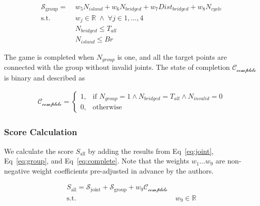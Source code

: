 \begin{equation}
 \begin{aligned}
 \mathcal{S}_{\text{group}} =  &\; w_5 N_{island} + w_6 N_{bridged} + w_7 Dist_{bridged} + w_8 N_{cycle}\\
   \textrm{s.t.} & \; w_j  \in \mathbb{R} \; \wedge \;   \forall j \in 1, \dotsc , 4 \\
   & \; N_{bridged} \leq T_{all} \\
   & \; N_{island} \leq Br
 \end{aligned}
 \label{eq:group}
\end{equation}

The game is completed when $N_{group}$ is one, and all the target points are connected with the group without invalid joints.
The state of completion $\mathcal{C_\text{complete}}$ is binary and described as

\begin{equation}
 \begin{aligned}
 \mathcal{C_\text{complete}} =
 \begin{cases}
    1,  & \text{if }   N_{group} = 1 \wedge N_{bridged} = T_{all}
    \wedge  N_{invalid} = 0 \\
    0,  & \text{otherwise}
\end{cases}
 \end{aligned}
 \label{eq:complete}
\end{equation}

\subsubsection{Score Calculation}
We calculate the score $S_\text{all}$ by adding the results from Eq~\ref{eq:joint}, Eq~\ref{eq:group}, and Eq~\ref{eq:complete}.
Note that the weights $w_1 \dotso  w_9$ are non-negative weight coefficients pre-adjusted in advance by the authors.

\begin{equation}
 \begin{aligned}
 S_\text{all} = \mathcal{S}_{\text{joint}} + \mathcal{S}_{\text{group}} + w_9 \mathcal{C_\text{complete}} \\
   \textrm{s.t.} & \; w_9  \in \mathbb{R}
 \end{aligned}
 \label{eq:score}
\end{equation}
